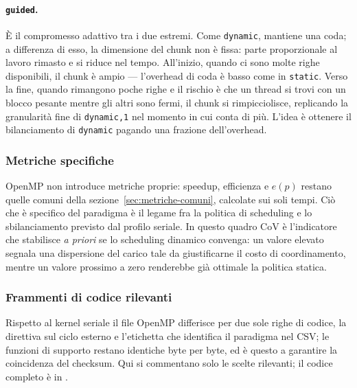 \paragraph{\texttt{guided}.}
È il compromesso adattivo tra i due estremi. Come \texttt{dynamic}, mantiene
una coda; a differenza di esso, la dimensione del chunk non è fissa: parte
proporzionale al lavoro rimasto e si riduce nel tempo. All'inizio, quando ci
sono molte righe disponibili, il chunk è ampio --- l'overhead di coda è basso
come in \texttt{static}. Verso la fine, quando rimangono poche righe e il
rischio è che un thread si trovi con un blocco pesante mentre gli altri sono
fermi, il chunk si rimpicciolisce, replicando la granularità fine di
\texttt{dynamic,1} nel momento in cui conta di più. L'idea è ottenere il
bilanciamento di \texttt{dynamic} pagando una frazione dell'overhead.

\subsubsection{Metriche specifiche}
\label{sec:openmp-metriche}

OpenMP non introduce metriche proprie: speedup, efficienza e $e(p)$ restano
quelle comuni della sezione~\ref{sec:metriche-comuni}, calcolate sui soli tempi.
Ciò che è specifico del paradigma è il legame fra la politica di scheduling e lo
sbilanciamento previsto dal profilo seriale. In questo quadro $\mathrm{CoV}$ è
l'indicatore che stabilisce \emph{a priori} se lo scheduling dinamico convenga:
un valore elevato segnala una dispersione del carico tale da giustificarne il
costo di coordinamento, mentre un valore prossimo a zero renderebbe già ottimale
la politica statica.

\subsubsection{Frammenti di codice rilevanti}
\label{sec:openmp-codice}

Rispetto al kernel seriale il file OpenMP differisce per due sole righe di
codice, la direttiva sul ciclo esterno e l'etichetta che identifica il paradigma
nel CSV; le funzioni di supporto restano identiche byte per byte, ed è questo a
garantire
la coincidenza del checksum. Qui si commentano solo le scelte rilevanti; il
codice completo è in .

